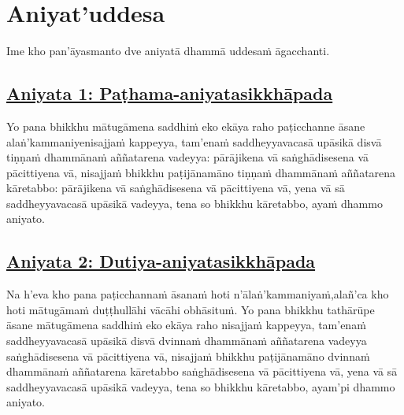 
\section{Aniyat'uddesa}
\label{aniy}

\begin{intro}
	Ime kho pan'āyasmanto dve aniyatā dhammā uddesaṁ āgacchanti.
\end{intro}

\subsection*{\hyperref[unc1]{Aniyata 1: Paṭhama-aniyatasikkhāpada}}
\label{aniy1}

Yo pana bhikkhu mātugāmena saddhiṁ eko ekāya raho paṭicchanne āsane alaṅ'kammaniye\makeatletter\hyperlink{endnote114-appendix}\makeatother \thinspace nisajjaṁ kappeyya, tam'enaṁ saddheyyavacasā upāsikā disvā tiṇṇaṁ dhammānaṁ aññatarena vadeyya: pārājikena vā saṅghādisesena vā pācittiyena vā, nisajjaṁ bhikkhu paṭijānamāno tiṇṇaṁ dhammānaṁ aññatarena kāretabbo: pārājikena vā saṅghādisesena vā pācittiyena vā, yena vā sā saddheyyavacasā upāsikā vadeyya, tena so bhikkhu kāretabbo, ayaṁ dhammo aniyato.



\subsection*{\hyperref[unc2]{Aniyata 2: Dutiya-aniyatasikkhāpada}}
\label{aniy2}

Na h'eva kho pana paṭicchannaṁ āsanaṁ hoti n'ālaṅ'kammaniyaṁ,\makeatletter\hyperlink{endnote115-appendix}\makeatother \thinspace alañ'ca kho hoti mātugāmaṁ duṭṭhullāhi vācāhi obhāsituṁ. Yo pana bhikkhu tathārūpe āsane mātugāmena saddhiṁ eko ekāya raho nisajjaṁ kappeyya, tam'enaṁ saddheyyavacasā upāsikā disvā dvinnaṁ dhammānaṁ aññatarena vadeyya saṅghādisesena vā pācittiyena vā, nisajjaṁ bhikkhu paṭijānamāno dvinnaṁ dhammānaṁ aññatarena kāretabbo saṅghādisesena vā pācittiyena vā, yena vā sā saddheyyavacasā upāsikā vadeyya, tena so bhikkhu kāretabbo, ayam'pi dhammo aniyato.



